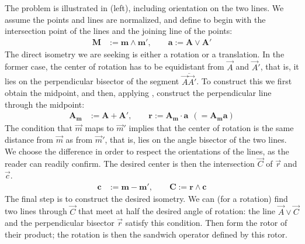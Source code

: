 \documentclass[12pt]{article}
\begin{document}
The problem is illustrated in  (left), including orientation on the two lines.  We assume the points and lines are normalized, and define to begin with the intersection point of the lines and the joining line of the points:
\begin{align*} 
\mathbf{M} &:= \mathbf{m} \wedge \mathbf{m'},\qquad%
\mathbf{a} := \mathbf{A} \vee \mathbf{A'}   %
\end{align*}
The direct isometry we are seeking is either a rotation or a translation.  In the former case, the center of rotation has to be equidistant from $\vec{A}$ and $\vec{A}'$, that is, it lies on the perpendicular bisector of the segment $\overline{\vec{A}\vec{A}'}$. To construct this we first obtain the midpoint, and then, applying , construct the perpendicular line through the midpoint:
\begin{align*}
\mathbf{A_m} &:= \mathbf{A} + \mathbf{A'}, \qquad%
\mathbf{r} := \mathbf{A_m} \cdot \mathbf{a}~~ (=\mathbf{A_m} \mathbf{a})   %
\end{align*}
The condition that $\vec{m}$ maps to $\vec{m}'$ implies that the center of rotation is the same distance from $\vec{m}$ as from $\vec{m}'$, that is, lies on the angle bisector of the two lines.  We choose the difference in order to respect the orientations of the lines, as the reader can readily confirm. The desired center is then the intersection $\vec{C}$ of $\vec{r}$ and $\vec{c}$.
\begin{align*}
\mathbf{c} &:= \mathbf{m} - \mathbf{m'}, \qquad  %
\mathbf{C} := \mathbf{r} \wedge \mathbf{c}   %
\end{align*}
The final step is to construct the desired isometry.  We can (for a rotation) find two lines through $\vec{C}$ that meet at half the desired angle of rotation: the line $\vec{A} \vee \vec{C}$ and the perpendicular bisector $\vec{r}$ satisfy this condition.  Then form the rotor of their product; the rotation is then the sandwich operator defined by this rotor.  
\end{document}
